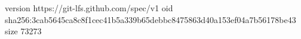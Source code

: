 version https://git-lfs.github.com/spec/v1
oid sha256:3cab5645ca8c8f1cec41b5a339b65debbc8475863d40a153ef04a7b56178be43
size 73273
